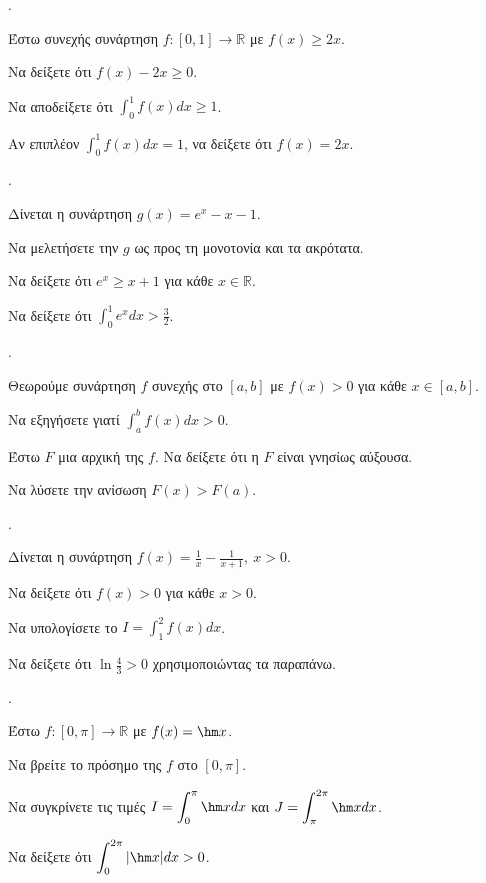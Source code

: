 \documentclass[11pt,a4paper,twocolumn]{article}
\newcounter{askhsh}
\newcommand{\askhsh}{\large\theaskhsh.\ \addtocounter{askhsh}{1}}
\begin{document}
\askhsh Έστω συνεχής συνάρτηση $f:[0,1]\to\mathbb{R}$ με $f(x) \ge 2x$.
\begin{alist}
\item Να δείξετε ότι $f(x) - 2x \ge 0$.
\item Να αποδείξετε ότι $\displaystyle \int_0^1 f(x) dx \ge 1$.
\item Αν επιπλέον $\displaystyle \int_0^1 f(x) dx = 1$, να δείξετε ότι $f(x)=2x$.
\end{alist}

\askhsh Δίνεται η συνάρτηση $g(x) = e^x - x - 1$.
\begin{alist}
\item Να μελετήσετε την $g$ ως προς τη μονοτονία και τα ακρότατα.
\item Να δείξετε ότι $e^x \ge x+1$ για κάθε $x \in \mathbb{R}$.
\item Να δείξετε ότι $\displaystyle \int_0^1 e^x dx > \frac{3}{2}$.
\end{alist}

\askhsh Θεωρούμε συνάρτηση $f$ συνεχής στο $[a,b]$ με $f(x) > 0$ για κάθε $x \in [a,b]$.
\begin{alist}
\item Να εξηγήσετε γιατί $\displaystyle \int_a^b f(x) dx > 0$.
\item Έστω $F$ μια αρχική της $f$. Να δείξετε ότι η $F$ είναι γνησίως αύξουσα.
\item Να λύσετε την ανίσωση $F(x) > F(a)$.
\end{alist}

\askhsh Δίνεται η συνάρτηση $f(x) = \frac{1}{x} - \frac{1}{x+1}, \ x>0$.
\begin{alist}
\item Να δείξετε ότι $f(x) > 0$ για κάθε $x>0$.
\item Να υπολογίσετε το $I = \displaystyle \int_1^2 f(x) dx$.
\item Να δείξετε ότι $\displaystyle \ln\frac{4}{3} > 0$ χρησιμοποιώντας τα παραπάνω.
\end{alist}

\askhsh Έστω $f:[0, \pi] \to \mathbb{R}$ με $f(x) = \hm x$.
\begin{alist}
\item Να βρείτε το πρόσημο της $f$ στο $[0, \pi]$.
\item Να συγκρίνετε τις τιμές $I = \displaystyle \int_0^{\pi} \hm x dx$ και $J = \displaystyle \int_{\pi}^{2\pi} \hm x dx$.
\item Να δείξετε ότι $\displaystyle \int_0^{2\pi} |\hm x| dx > 0$.
\end{alist}
\end{document}
